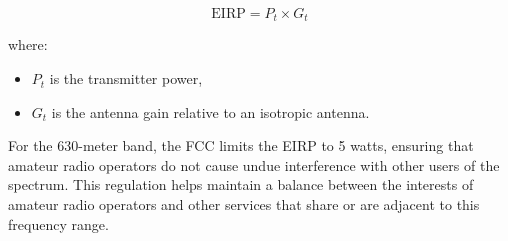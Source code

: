 \[
\text{EIRP} = P_t \times G_t
\]

where:
\begin{itemize}
    \item \( P_t \) is the transmitter power,
    \item \( G_t \) is the antenna gain relative to an isotropic antenna.
\end{itemize}

For the 630-meter band, the FCC limits the EIRP to 5 watts, ensuring that amateur radio operators do not cause undue interference with other users of the spectrum. This regulation helps maintain a balance between the interests of amateur radio operators and other services that share or are adjacent to this frequency range.

